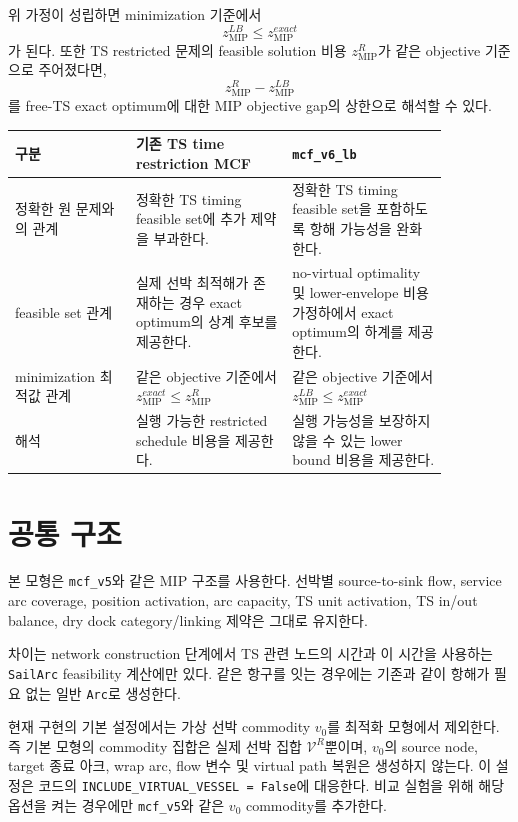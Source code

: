 \documentclass[11pt]{article}
\begin{document}
위 가정이 성립하면 minimization 기준에서
\[
  z^{LB}_{\mathrm{MIP}} \le z^{exact}_{\mathrm{MIP}}
\]
가 된다. 또한 TS restricted 문제의 feasible solution 비용 $z^{R}_{\mathrm{MIP}}$가
같은 objective 기준으로 주어졌다면,
\[
  z^{R}_{\mathrm{MIP}} - z^{LB}_{\mathrm{MIP}}
\]
를 free-TS exact optimum에 대한 MIP objective gap의 상한으로 해석할 수
있다.

\begin{center}
\begin{tabular}{@{}p{0.24\linewidth}p{0.31\linewidth}p{0.31\linewidth}@{}}
\toprule
구분 & 기존 TS time restriction MCF & \texttt{mcf\_v6\_lb} \\
\midrule
정확한 원 문제와의 관계
& 정확한 TS timing feasible set에 추가 제약을 부과한다.
& 정확한 TS timing feasible set을 포함하도록 항해 가능성을 완화한다. \\
\addlinespace
feasible set 관계
& 실제 선박 최적해가 존재하는 경우 exact optimum의 상계 후보를 제공한다.
& no-virtual optimality 및 lower-envelope 비용 가정하에서 exact optimum의 하계를 제공한다. \\
\addlinespace
minimization 최적값 관계
& 같은 objective 기준에서 $z^{exact}_{\mathrm{MIP}} \le z^R_{\mathrm{MIP}}$
& 같은 objective 기준에서 $z^{LB}_{\mathrm{MIP}} \le z^{exact}_{\mathrm{MIP}}$ \\
\addlinespace
해석
& 실행 가능한 restricted schedule 비용을 제공한다.
& 실행 가능성을 보장하지 않을 수 있는 lower bound 비용을 제공한다. \\
\bottomrule
\end{tabular}
\end{center}

\section{공통 구조}

본 모형은 \texttt{mcf\_v5}와 같은 MIP 구조를 사용한다. 선박별 source-to-sink
flow, service arc coverage, position activation, arc capacity, TS unit activation,
TS in/out balance, dry dock category/linking 제약은 그대로 유지한다.

차이는 network construction 단계에서 TS 관련 노드의 시간과 이 시간을 사용하는
\texttt{SailArc} feasibility 계산에만 있다. 같은 항구를 잇는 경우에는 기존과
같이 항해가 필요 없는 일반 \texttt{Arc}로 생성한다.

현재 구현의 기본 설정에서는 가상 선박 commodity $v_0$를 최적화 모형에서 제외한다.
즉 기본 모형의 commodity 집합은 실제 선박 집합 $\mathcal{V}^{R}$뿐이며, $v_0$의
source node, target 종료 아크, wrap arc, flow 변수 및 virtual path 복원은 생성하지
않는다. 이 설정은 코드의 \texttt{INCLUDE\_VIRTUAL\_VESSEL = False}에 대응한다.
비교 실험을 위해 해당 옵션을 켜는 경우에만 \texttt{mcf\_v5}와 같은 $v_0$ commodity를
추가한다.
\end{document}
